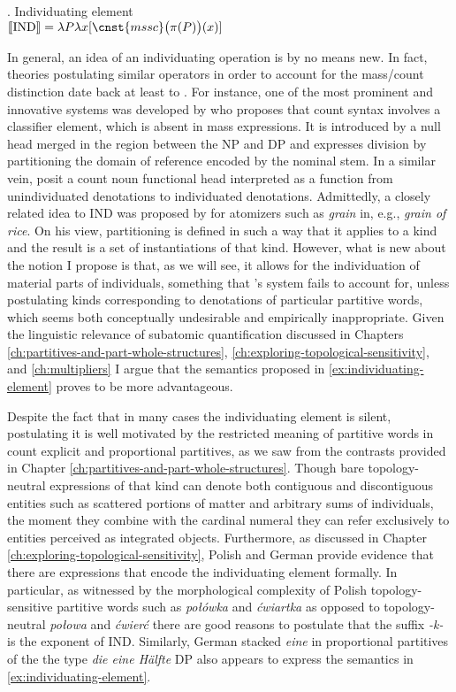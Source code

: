 	\ex. Individuating element\\
	$\llbracket \text{IND}\rrbracket = \lambda P \lambda x[\cnst{mssc}\big(\pi(P)\big)(x)]$\label{ex:individuating-element}
	
	In general, an idea of an individuating operation is by no means new. In fact, theories postulating similar operators in order to account for the mass/count distinction date back at least to \citet{sharvy1979indeterminacy}. For instance, one of the most prominent and innovative systems was developed by \citet{borer2005name} who proposes that count syntax involves a classifier element, which is absent in mass expressions. It is introduced by a null head merged in the region between the NP and DP and expresses division by partitioning the  domain of reference encoded by the nominal stem. In a similar vein, \citet{bale_barner2009interpretation} posit a count noun functional head interpreted as a function from unindividuated denotations to individuated denotations. Admittedly, a closely related idea to IND was proposed by \citet[p. 97]{scontras2014semantics} for atomizers such as \textit{grain} in, e.g., \textit{grain of rice}. On his view, partitioning is defined in such a way that it applies to a kind and the result is a set of  instantiations of that kind. However, what is new about the notion I propose is that, as we will see, it allows for the individuation of material parts of individuals, something that \citeauthor{scontras2014semantics}'s system fails to account for, unless postulating kinds corresponding to denotations of particular partitive words, which seems both conceptually undesirable and empirically inappropriate. Given the linguistic relevance of subatomic quantification discussed in Chapters \ref{ch:partitives-and-part-whole-structures}, \ref{ch:exploring-topological-sensitivity}, and \ref{ch:multipliers} I argue that the semantics proposed in \ref{ex:individuating-element} proves to be more advantageous.
	
	Despite the fact that in many cases the individuating element is silent, postulating it is well motivated by the restricted meaning of partitive words in count explicit and proportional partitives, as we saw from the contrasts provided in Chapter \ref{ch:partitives-and-part-whole-structures}. Though bare topology-neutral expressions of that kind can denote both contiguous and discontiguous entities such as scattered portions of matter and arbitrary sums of individuals, the moment they combine with the cardinal numeral they can refer exclusively to entities perceived as integrated objects. Furthermore, as discussed in Chapter \ref{ch:exploring-topological-sensitivity}, Polish and German provide evidence that there are expressions that encode the individuating element formally. In particular, as witnessed by the morphological complexity of Polish topology-sensitive partitive words such as \textit{połówka} and \textit{ćwiartka} as opposed to topology-neutral \textit{połowa} and \textit{ćwierć} there are good reasons to postulate that the suffix \textit{-k-} is the exponent of IND. Similarly, German stacked \textit{eine} in proportional partitives of the the type \textit{die eine Hälfte} DP also appears to express the semantics in \ref{ex:individuating-element}.
	
